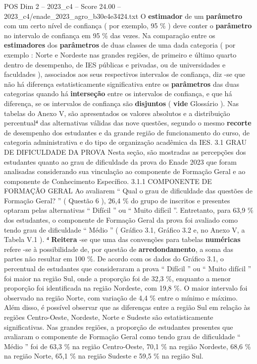 \begin{textsample}{POS Dim 2 – 2023\_c4 – Score 24.00 – 2023\_c4/enade\_2023\_agro\_b30e4e3424.txt}
O \textbf{estimador} de um \textbf{parâmetro} com um certo nível de confiança ( por exemplo, 95 \% ) deve conter o \textbf{parâmetro} no intervalo de confiança em 95 \% das vezes.
Na comparação entre os \textbf{estimadores} dos \textbf{parâmetros} de duas classes de uma dada categoria ( por exemplo : Norte e Nordeste nas grandes regiões, de primeiro e último quarto dentro de desempenho, de IES públicas e privadas, ou de universidades e faculdades ), associados aos seus respectivos intervalos de confiança, diz -se que não há diferença estatisticamente significativa entre os \textbf{parâmetros} das duas categorias quando há \textbf{interseção} entre os intervalos de confiança, e que há diferença, se os intervalos de confiança são \textbf{disjuntos} ( \textbf{vide} Glossário ).
Nas tabelas do Anexo V, são apresentados os valores absolutos e a distribuição percentual⁴ das alternativas válidas das nove questões, segundo o mesmo \textbf{recorte} de desempenho dos estudantes e da grande região de funcionamento do curso, de categoria administrativa e do tipo de organização acadêmica da IES. 3.1 GRAU DE DIFICULDADE DA PROVA Nesta seção, são mostradas as percepções dos estudantes quanto ao grau de dificuldade da prova do Enade 2023 que foram analisadas considerando sua vinculação ao componente de Formação Geral e ao componente de Conhecimento Específico. 3.1.1 COMPONENTE DE FORMAÇÃO GERAL Ao avaliarem “ Qual o grau de dificuldade das questões de Formação Geral? ” ( Questão 6 ), 26,4 \% do grupo de inscritos e presentes optaram pelas alternativas “ Difícil ” ou “ Muito difícil ”.
Entretanto, para 63,9 \% dos estudantes, o componente de Formação Geral da prova foi avaliado como tendo grau de dificuldade “ Médio ” ( Gráfico 3.1, Gráfico 3.2 e, no Anexo V, a Tabela V.1 ). ⁴ \textbf{Reitera} -se que uma das convenções para tabelas \textbf{numéricas} refere -se à possibilidade de, por questão de \textbf{arredondamento}, a soma das partes não resultar em 100 \%.
De acordo com os dados do Gráfico 3.1, o percentual de estudantes que consideraram a prova “ Difícil ” ou “ Muito difícil ” foi maior na região Sul, onde a proporção foi de 32,3 \%, enquanto a menor proporção foi identificada na região Nordeste, com 19,8 \%.
O maior intervalo foi observado na região Norte, com variação de 4,4 \% entre o mínimo e máximo.
Além disso, é possível observar que as diferenças entre a região Sul em relação às regiões Centro-Oeste, Nordeste, Norte e Sudeste são estatisticamente significativas.
Nas grandes regiões, a proporção de estudantes presentes que avaliaram o componente de Formação Geral como tendo grau de dificuldade “ Médio ” foi de 63,3 \% na região Centro-Oeste, 70,1 \% na região Nordeste, 68,6 \% na região Norte, 65,1 \% na região Sudeste e 59,5 \% na região Sul.

\end{textsample}
